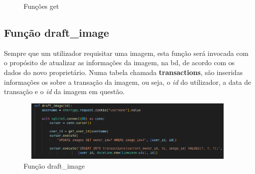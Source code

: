\documentclass{report}
\begin{document}
\begin{figure}[H]%
    \centering
    \qquad
    \caption{Funções get}%
    \label{fig:funcoesget}%
\end{figure}

\subsection{Função draft\_image}
\label{ssec.funcaodraftimage}

Sempre que um utilizador requisitar uma imagem, esta função será invocada com o propósito de atualizar as informações da imagem, na \ac{bd}, de acordo com os dados do novo proprietário.
Numa tabela chamada \textbf{transactions}, são inseridas informações os sobre a transação da imagem, ou seja, o \textit{id} do utilizador, a data de transação e o \textit{id} da imagem em questão. 

\begin{figure}[H]
	\centering
	\includegraphics[height=3cm, width=12cm]{images/draftimage.png}
	\caption{Função draft\_image}
	\label{fig.funcaodbstoreimage}
\end{figure} 
\end{document}
